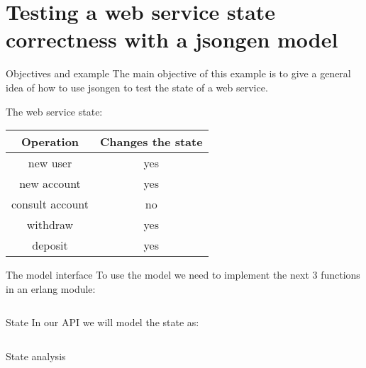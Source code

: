 \section{Testing a web service state correctness with a jsongen model}

\begin{frame}{Objectives and example}
  The main objective of this example is to give a general idea of how
  to use jsongen to test the state of a web service.

  The web service state:\\

  \centering
  \begin{tabular}{| c | c |}
    \hline
    \textbf{Operation}   & \textbf{Changes the state} \\ \hline
    new user    & yes \\ \hline
    new account & yes \\ \hline
    consult account & no \\ \hline
    withdraw    & yes \\ \hline
    deposit     & yes \\ \hline
  \end{tabular}
  \centering
\end{frame}

\begin{frame}{The model interface}
  To use the model we need to implement the next 3 functions in an
  erlang module:

  \inputminted{erlang}{./code/interface.erl}
\end{frame}

\begin{frame}{State}
  In our API we will model the state as:

  \inputminted{erlang}{./code/state.erl}
\end{frame}

\begin{frame}{State analysis}
  \begin{figure}
    \centering
      \begin{overprint}[\textwidth]
  \end{overprint}
  \end{figure}
\end{frame}

